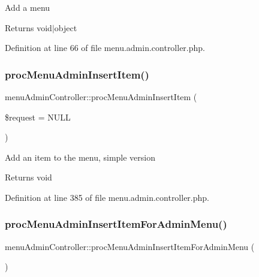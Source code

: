 Add a menu \begin{DoxyReturn}{Returns}
void$\vert$object 
\end{DoxyReturn}


Definition at line 66 of file menu.\+admin.\+controller.\+php.

\hypertarget{classmenuAdminController_a34064cdce4df5a16faf19ada16751afe}{}\label{classmenuAdminController_a34064cdce4df5a16faf19ada16751afe} 
\subsubsection{\texorpdfstring{proc\+Menu\+Admin\+Insert\+Item()}{procMenuAdminInsertItem()}}
{\footnotesize\ttfamily menu\+Admin\+Controller\+::proc\+Menu\+Admin\+Insert\+Item (\begin{DoxyParamCaption}\item[{}]{\$request = {\ttfamily NULL} }\end{DoxyParamCaption})}

Add an item to the menu, simple version \begin{DoxyReturn}{Returns}
void 
\end{DoxyReturn}


Definition at line 385 of file menu.\+admin.\+controller.\+php.

\hypertarget{classmenuAdminController_a788f347d7232e73062a39785960a4f14}{}\label{classmenuAdminController_a788f347d7232e73062a39785960a4f14} 
\subsubsection{\texorpdfstring{proc\+Menu\+Admin\+Insert\+Item\+For\+Admin\+Menu()}{procMenuAdminInsertItemForAdminMenu()}}
{\footnotesize\ttfamily menu\+Admin\+Controller\+::proc\+Menu\+Admin\+Insert\+Item\+For\+Admin\+Menu (\begin{DoxyParamCaption}{ }\end{DoxyParamCaption})}

